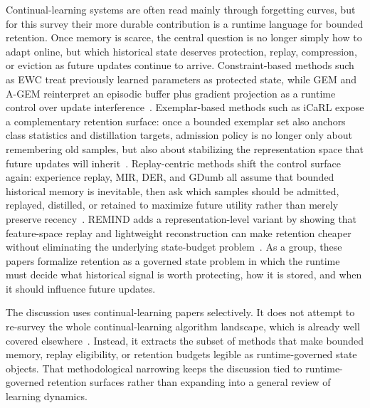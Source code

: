 \documentclass[acmsmall,screen,review]{acmart}
\begin{document}
Continual-learning systems are often read mainly through forgetting curves, but for this survey their more durable contribution is a runtime language for bounded retention. Once memory is scarce, the central question is no longer simply how to adapt online, but which historical state deserves protection, replay, compression, or eviction as future updates continue to arrive. Constraint-based methods such as EWC treat previously learned parameters as protected state, while GEM and A-GEM reinterpret an episodic buffer plus gradient projection as a runtime control over update interference~\cite{kirkpatrick2017ewc,lopez2017gem,chaudhry2019agem}. Exemplar-based methods such as iCaRL expose a complementary retention surface: once a bounded exemplar set also anchors class statistics and distillation targets, admission policy is no longer only about remembering old samples, but also about stabilizing the representation space that future updates will inherit~\cite{rebuffi2017icarl}. Replay-centric methods shift the control surface again: experience replay, MIR, DER, and GDumb all assume that bounded historical memory is inevitable, then ask which samples should be admitted, replayed, distilled, or retained to maximize future utility rather than merely preserve recency~\cite{rolnick2019experience,aljundi2019mir,buzzega2020der,prabhu2020gdumb}. REMIND adds a representation-level variant by showing that feature-space replay and lightweight reconstruction can make retention cheaper without eliminating the underlying state-budget problem~\cite{hayes2020remind}. As a group, these papers formalize retention as a governed state problem in which the runtime must decide what historical signal is worth protecting, how it is stored, and when it should influence future updates.

The discussion uses continual-learning papers selectively. It does not attempt to re-survey the whole continual-learning algorithm landscape, which is already well covered elsewhere~\cite{delange2021survey}. Instead, it extracts the subset of methods that make bounded memory, replay eligibility, or retention budgets legible as runtime-governed state objects. That methodological narrowing keeps the discussion tied to runtime-governed retention surfaces rather than expanding into a general review of learning dynamics.
\end{document}
